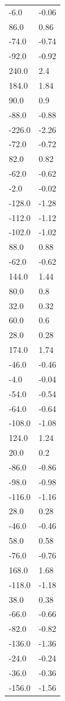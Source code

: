 \begin{longtable}{ll}
-6.0 & -0.06 \\
86.0 & 0.86 \\
-74.0 & -0.74 \\
-92.0 & -0.92 \\
240.0 & 2.4 \\
184.0 & 1.84 \\
90.0 & 0.9 \\
-88.0 & -0.88 \\
-226.0 & -2.26 \\
-72.0 & -0.72 \\
82.0 & 0.82 \\
-62.0 & -0.62 \\
-2.0 & -0.02 \\
-128.0 & -1.28 \\
-112.0 & -1.12 \\
-102.0 & -1.02 \\
88.0 & 0.88 \\
-62.0 & -0.62 \\
144.0 & 1.44 \\
80.0 & 0.8 \\
32.0 & 0.32 \\
60.0 & 0.6 \\
28.0 & 0.28 \\
174.0 & 1.74 \\
-46.0 & -0.46 \\
-4.0 & -0.04 \\
-54.0 & -0.54 \\
-64.0 & -0.64 \\
-108.0 & -1.08 \\
124.0 & 1.24 \\
20.0 & 0.2 \\
-86.0 & -0.86 \\
-98.0 & -0.98 \\
-116.0 & -1.16 \\
28.0 & 0.28 \\
-46.0 & -0.46 \\
58.0 & 0.58 \\
-76.0 & -0.76 \\
168.0 & 1.68 \\
-118.0 & -1.18 \\
38.0 & 0.38 \\
-66.0 & -0.66 \\
-82.0 & -0.82 \\
-136.0 & -1.36 \\
-24.0 & -0.24 \\
-36.0 & -0.36 \\
-156.0 & -1.56 \\

\end{longtable}
